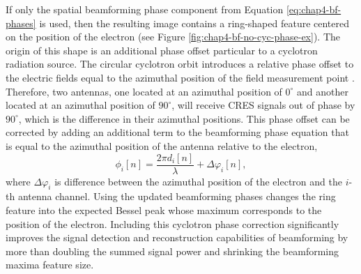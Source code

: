 If only the spatial beamforming phase component from Equation \ref{eq:chap4-bf-phases} is used, then the resulting image contains a ring-shaped feature centered on the position of the electron (see Figure \ref{fig:chap4-bf-no-cyc-phase-ex}). The origin of this shape is an additional phase offset particular to a cyclotron radiation source. The circular cyclotron orbit introduces a relative phase offset to the electric fields equal to the azimuthal position of the field measurement point \cite{nb_thesis, p8synca}. Therefore, two antennas, one located at an azimuthal position of $0^\circ$ and another located at an azimuthal position of $90^\circ$, will receive CRES signals out of phase by $90^\circ$, which is the difference in their azimuthal positions. This phase offset can be corrected by adding an additional term to the beamforming phase equation that is equal to the azimuthal position of the antenna relative to the electron, 
\begin{equation}
    \phi_i[n] = \frac{2\pi d_i[n]}{\lambda} + \Delta\varphi_i[n],
    \label{eq:chap4-beamforming-phases}
\end{equation}
where $\Delta\varphi_i$ is difference between the azimuthal position of the electron and the $i$-th antenna channel. Using the updated beamforming phases changes the ring feature into the expected Bessel peak whose maximum corresponds to the position of the electron. Including this cyclotron phase correction significantly improves the signal detection and reconstruction capabilities of beamforming by more than doubling the summed signal power and shrinking the beamforming maxima feature size. 

